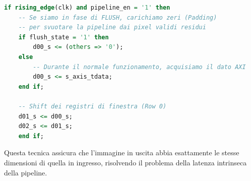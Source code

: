 \begin{lstlisting}[language=VHDL, caption={Multiplexer di ingresso per gestione Flush e Padding}, label={lst:flush_logic}]
	if rising_edge(clk) and pipeline_en = '1' then
	-- Se siamo in fase di FLUSH, carichiamo zeri (Padding)
	-- per svuotare la pipeline dai pixel validi residui
	if flush_state = '1' then
		d00_s <= (others => '0');
	else
		-- Durante il normale funzionamento, acquisiamo il dato AXI
		d00_s <= s_axis_tdata; 
	end if;
	
	-- Shift dei registri di finestra (Row 0)
	d01_s <= d00_s;
	d02_s <= d01_s;
	end if;
\end{lstlisting}

Questa tecnica assicura che l'immagine in uscita abbia esattamente le stesse dimensioni di quella in ingresso, risolvendo il problema della latenza intrinseca della pipeline.